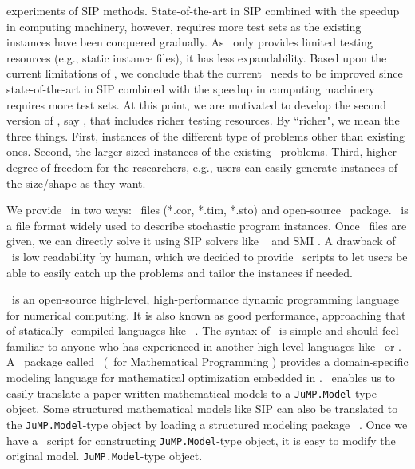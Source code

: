 experiments of SIP methods. State-of-the-art in SIP combined with the speedup in computing 
machinery, however, requires more test sets as the existing instances have been conquered 
gradually. As \siplib\ only provides limited testing resources (e.g., static instance files), 
it has less expandability. 
Based upon the current limitations of \siplib, we conclude that the current \siplib\ needs to 
be improved since state-of-the-art in SIP combined with the speedup in computing machinery 
requires more test sets. At this point, we are motivated to develop the second version of 
\siplib, say \siplibtwo, that includes richer testing resources. By ``richer", we mean the 
three things. First, instances of the different type of problems other than existing ones. 
Second, the larger-sized instances of the existing \siplib\ problems. Third, higher degree of 
freedom for the researchers, e.g., users can easily generate instances of the size/shape as 
they want.

We provide \siplibtwo\ in two ways: \smps\ files (*.cor, *.tim, *.sto) and open-source 
\julia\ package. \smps\ is a file format widely used to describe stochastic program 
instances. Once \smps\ files are given, we can directly solve it using SIP solvers like \dsp\ 
\cite{journal:KZ2015} and \textsf{SMI} \cite{web:SMI}. A drawback of \smps\ is low 
readability by human, which we decided to provide \julia\ scripts to let users be able to 
easily catch up the problems and tailor the instances if needed.

\julia\ is an open-source high-level, high-performance dynamic programming language for 
numerical computing. It is also known as good performance, approaching that of statically-
compiled languages like \clang\ \cite{journal:BEKS2017}. The syntax of \julia\ is simple and 
should feel familiar to anyone who has experienced in another high-level languages like 
\matlab\ or \python. A \julia\ package called \jump\ (\julia\ for Mathematical Programming 
\cite{journal:JuMP}) provides a domain-specific modeling language for mathematical 
optimization embedded in \julia. \jump\ enables us to easily translate a paper-written 
mathematical models to a \texttt{JuMP.Model}-type object. Some structured mathematical models 
like SIP can also be translated to the \texttt{JuMP.Model}-type object by loading a 
structured modeling package \structjump\ \cite{web:StructJuMP}. Once we have a \julia\ script 
for constructing \texttt{JuMP.Model}-type object, it is easy to modify the original model. 
\texttt{JuMP.Model}-type object. 

